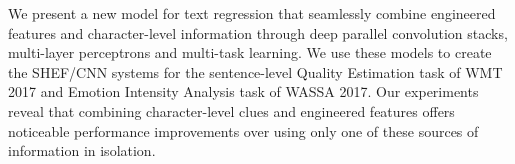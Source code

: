 We present a new model for text regression that seamlessly combine engineered features and character-level information through deep parallel convolution stacks, multi-layer perceptrons and multi-task learning. We use these models to create the SHEF/CNN systems for the sentence-level Quality Estimation task of WMT 2017 and Emotion Intensity Analysis task of WASSA 2017. Our experiments reveal that combining character-level clues and engineered features offers noticeable performance improvements over using only one of these sources of information in isolation.
